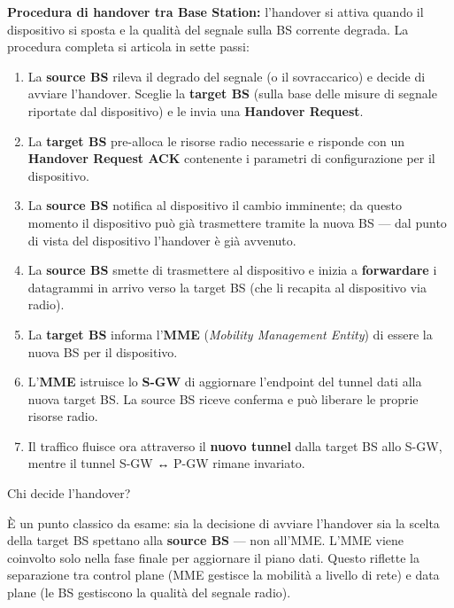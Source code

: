 \documentclass[
  italian,
  openany]{book}
\providecommand{\tightlist}{%
  \setlength{\itemsep}{0pt}\setlength{\parskip}{0pt}}
\begin{document}
\textbf{Procedura di handover tra Base Station:} l'handover si attiva
quando il dispositivo si sposta e la qualità del segnale sulla BS
corrente degrada. La procedura completa si articola in sette passi:

\begin{enumerate}
\def\labelenumi{\arabic{enumi}.}
\tightlist
\item
  La \textbf{source BS} rileva il degrado del segnale (o il
  sovraccarico) e decide di avviare l'handover. Sceglie la
  \textbf{target BS} (sulla base delle misure di segnale riportate dal
  dispositivo) e le invia una \textbf{Handover Request}.
\item
  La \textbf{target BS} pre-alloca le risorse radio necessarie e
  risponde con un \textbf{Handover Request ACK} contenente i parametri
  di configurazione per il dispositivo.
\item
  La \textbf{source BS} notifica al dispositivo il cambio imminente; da
  questo momento il dispositivo può già trasmettere tramite la nuova BS
  --- dal punto di vista del dispositivo l'handover è già avvenuto.
\item
  La \textbf{source BS} smette di trasmettere al dispositivo e inizia a
  \textbf{forwardare} i datagrammi in arrivo verso la target BS (che li
  recapita al dispositivo via radio).
\item
  La \textbf{target BS} informa l'\textbf{MME} (\emph{Mobility
  Management Entity}) di essere la nuova BS per il dispositivo.
\item
  L'\textbf{MME} istruisce lo \textbf{S-GW} di aggiornare l'endpoint del
  tunnel dati alla nuova target BS. La source BS riceve conferma e può
  liberare le proprie risorse radio.
\item
  Il traffico fluisce ora attraverso il \textbf{nuovo tunnel} dalla
  target BS allo S-GW, mentre il tunnel S-GW ↔ P-GW rimane invariato.
\end{enumerate}

\begin{callouttip}{Chi decide l’handover?}

È un punto classico da esame: sia la decisione di avviare l'handover sia
la scelta della target BS spettano alla \textbf{source BS} --- non
all'MME. L'MME viene coinvolto solo nella fase finale per aggiornare il
piano dati. Questo riflette la separazione tra control plane (MME
gestisce la mobilità a livello di rete) e data plane (le BS gestiscono
la qualità del segnale radio).

\end{callouttip}
\end{document}
